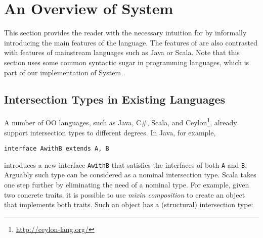 \section{An Overview of System \name}



This section provides the reader with the necessary intuition for
\name by informally introducing the main features of the language.
The features of \name are also contrasted with features of mainstream
languages such as Java or Scala. Note that this section uses some 
common syntactic sugar in programming languages, which is 
part of our implementation of System \name.
 

\subsection{Intersection Types in Existing Languages}\label{subsec:interScala}

A number of OO languages, such as Java, C\#, Scala, and
Ceylon\footnote{\url{http://ceylon-lang.org/}}, already support intersection
types to different degrees. In Java, for example,

\begin{lstlisting}
interface AwithB extends A, B 
\end{lstlisting}

\noindent introduces a new interface \lstinline{AwithB} that satisfies the interfaces of
both \lstinline{A} and \lstinline{B}. Arguably such type can be considered as a nominal
intersection type. Scala takes one step further by eliminating the
need of a nominal type. For example, given two concrete traits, it is possible to
use \emph{mixin composition} to create an object that implements both 
traits. Such an object has a (structural) intersection type:

